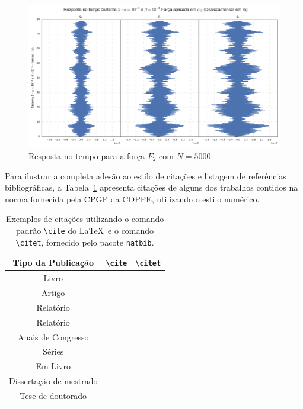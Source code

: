 \begin{figure}
	\centering
	\includegraphics[scale=0.6]{IMGS/F2_5000_tempo.pdf}
	\caption{Resposta no tempo para a força $F_2$ com $N=5000$}
	\label{fig:F2_5000_tempo}
\end{figure}

Para ilustrar a completa ades\~ao ao estilo de cita{\c c}\~oes e listagem de
refer\^encias bibliogr\'aficas, a Tabela~\ref{tab:citation} apresenta cita{\c
c}\~oes de alguns dos trabalhos contidos na norma fornecida pela CPGP da
COPPE, utilizando o estilo num\'erico.

\begin{table}[h]
\caption{Exemplos de cita{\c c}\~oes utilizando o comando padr\~ao
  \texttt{\textbackslash cite} do \LaTeX\ e
  o comando \texttt{\textbackslash citet},
  fornecido pelo pacote \texttt{natbib}.}
\label{tab:citation}
\centering
{\footnotesize
\begin{tabular}{|c|c|c|}
  \hline
  Tipo da Publica{\c c}\~ao & \verb|\cite| & \verb|\citet|\\
  \hline
  Livro & \cite{book-example} & \citet{book-example}\\
  Artigo & \cite{article-example} & \citet{article-example}\\
  Relat\'orio & \cite{techreport-example} & \citet{techreport-example}\\
  Relat\'orio & \cite{techreport-exampleIn} & \citet{techreport-exampleIn}\\
  Anais de Congresso & \cite{inproceedings-example} &
    \citet{inproceedings-example}\\
  S\'eries & \cite{incollection-example} & \citet{incollection-example}\\
  Em Livro & \cite{inbook-example} & \citet{inbook-example}\\
  Disserta{\c c}\~ao de mestrado & \cite{mastersthesis-example} &
    \citet{mastersthesis-example}\\
  Tese de doutorado & \cite{phdthesis-example} & \citet{phdthesis-example}\\
  \hline
\end{tabular}}
\end{table}

